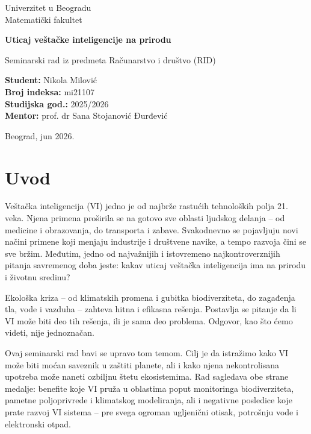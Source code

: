 \documentclass[12pt,a4paper]{article}
\begin{document}
\begin{titlepage}
\thispagestyle{empty}
\begin{center}
    {\large Univerzitet u Beogradu\\[0.2cm]
    Matematički fakultet}\par
    \vspace{3.2cm}
    {\LARGE\bfseries Uticaj veštačke inteligencije na prirodu}\par
    \vspace{0.5cm}
    {\large Seminarski rad iz predmeta Računarstvo i društvo (RID)}\par
    \vfill
    \begin{flushleft}
    \hspace*{2cm}\textbf{Student:} Nikola Milović\\
    \hspace*{2cm}\textbf{Broj indeksa:} mi21107\\
    \hspace*{2cm}\textbf{Studijska god.:} 2025/2026\\
    \hspace*{2cm}\textbf{Mentor:} prof. dr Sana Stojanović Đurđević
    \end{flushleft}
    \vfill
    Beograd, jun 2026.
\end{center}
\end{titlepage}

\tableofcontents
\clearpage

\section{Uvod}
Veštačka inteligencija (VI) jedno je od najbrže rastućih tehnoloških polja 21. veka. Njena primena proširila se na gotovo sve oblasti ljudskog delanja -- od medicine i obrazovanja, do transporta i zabave. Svakodnevno se pojavljuju novi načini primene koji menjaju industrije i društvene navike, a tempo razvoja čini se sve bržim. Međutim, jedno od najvažnijih i istovremeno najkontroverznijih pitanja savremenog doba jeste: kakav uticaj veštačka inteligencija ima na prirodu i životnu sredinu?

Ekološka kriza -- od klimatskih promena i gubitka biodiverziteta, do zagađenja tla, vode i vazduha -- zahteva hitna i efikasna rešenja. Postavlja se pitanje da li VI može biti deo tih rešenja, ili je sama deo problema. Odgovor, kao što ćemo videti, nije jednoznačan.

Ovaj seminarski rad bavi se upravo tom temom. Cilj je da istražimo kako VI može biti moćan saveznik u zaštiti planete, ali i kako njena nekontrolisana upotreba može naneti ozbiljnu štetu ekosistemima. Rad sagledava obe strane medalje: benefite koje VI pruža u oblastima poput monitoringa biodiverziteta, pametne poljoprivrede i klimatskog modeliranja, ali i negativne posledice koje prate razvoj VI sistema -- pre svega ogroman ugljenični otisak, potrošnju vode i elektronski otpad.
\end{document}
